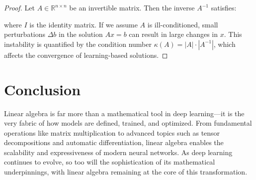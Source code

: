 \documentclass{article}
\begin{document}
\begin{proof}
Let $A \in \mathbb{R}^{n \times n}$ be an invertible matrix. Then the inverse $A^{-1}$ satisfies:

where $I$ is the identity matrix. If we assume $A$ is ill-conditioned, small perturbations $\Delta b$ in the solution $Ax = b$ can result in large changes in $x$. This instability is quantified by the condition number $\kappa(A) = |A| \cdot |A^{-1}|$, which affects the convergence of learning-based solutions.
\end{proof}


\section*{Conclusion}
Linear algebra is far more than a mathematical tool in deep learning—it is the very fabric of how models are defined, trained, and optimized. From fundamental operations like matrix multiplication to advanced topics such as tensor decompositions and automatic differentiation, linear algebra enables the scalability and expressiveness of modern neural networks. As deep learning continues to evolve, so too will the sophistication of its mathematical underpinnings, with linear algebra remaining at the core of this transformation.

\pagebreak


\end{document}
